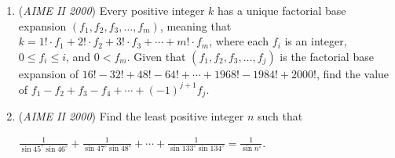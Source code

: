 \begin{enumerate}
 

	\item (\textit{AIME II 2000}) Every positive integer $k$ has a unique factorial base expansion $(f_1,f_2,f_3,\ldots,f_m)$, meaning that $k=1!\cdot f_1+2!\cdot f_2+3!\cdot f_3+\cdots+m!\cdot f_m$, where each $f_i$ is an integer, $0\le f_i\le i$, and $0<f_m$. Given that $(f_1,f_2,f_3,\ldots,f_j)$ is the factorial base expansion of $16!-32!+48!-64!+\cdots+1968!-1984!+2000!$, find the value of $f_1-f_2+f_3-f_4+\cdots+(-1)^{j+1}f_j$.


 

	\item (\textit{AIME II 2000}) 
Find the least positive integer $n$ such that 

 $\frac 1{\sin 45^\circ\sin 46^\circ}+\frac 1{\sin 47^\circ\sin 48^\circ}+\cdots+\frac 1{\sin 133^\circ\sin 134^\circ}=\frac 1{\sin n^\circ}.$


\end{enumerate}
